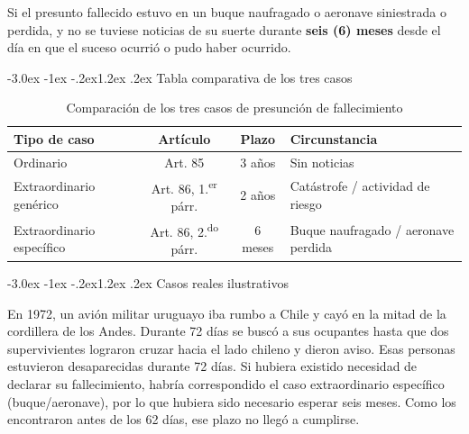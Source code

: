 \documentclass[12pt,oneside]{book}
\makeatletter
\renewcommand\section{\@startsection{section}{1}{\z@}%
  {-3.0ex \@plus -1ex \@minus -.2ex}{1.2ex \@plus .2ex}%
  {\normalfont\large\bfseries\color{acento}}}
\makeatother
\begin{document}
\begin{regla}
Si el presunto fallecido estuvo en un buque naufragado o aeronave
siniestrada o perdida, y no se tuviese noticias de su suerte durante
\textbf{seis (6) meses} desde el día en que el suceso ocurrió o pudo
haber ocurrido.
\end{regla}

\section{Tabla comparativa de los tres casos}

\begin{table}[H]
\centering
\begin{tabularx}{\textwidth}{>{\raggedright\arraybackslash}X c c >{\raggedright\arraybackslash}X}
\toprule
\textbf{Tipo de caso} & \textbf{Artículo} & \textbf{Plazo} & \textbf{Circunstancia} \\
\midrule
Ordinario & Art. 85 & 3 años & Sin noticias \\
Extraordinario genérico & Art. 86, 1.\textsuperscript{er} párr. & 2 años & Catástrofe / actividad de riesgo \\
Extraordinario específico & Art. 86, 2.\textsuperscript{do} párr. & 6 meses & Buque naufragado / aeronave perdida \\
\bottomrule
\end{tabularx}
\caption{Comparación de los tres casos de presunción de fallecimiento}
\end{table}

\section{Casos reales ilustrativos}

\begin{ejemplo}
En 1972, un avión militar uruguayo iba rumbo a Chile y cayó en la mitad
de la cordillera de los Andes. Durante 72 días se buscó a sus ocupantes
hasta que dos supervivientes lograron cruzar hacia el lado chileno y
dieron aviso. Esas personas estuvieron desaparecidas durante 72 días. Si
hubiera existido necesidad de declarar su fallecimiento, habría
correspondido el caso extraordinario específico (buque/aeronave), por lo
que hubiera sido necesario esperar seis meses.
Como los encontraron antes de los 62 días, ese plazo no llegó a cumplirse.
\end{ejemplo}
\end{document}
